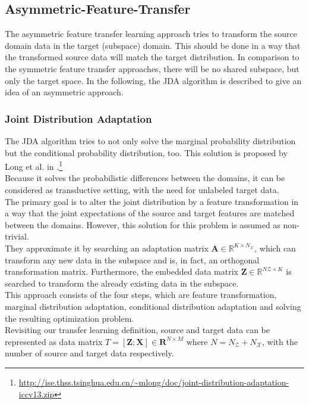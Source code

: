 \subsection{Asymmetric-Feature-Transfer}\label{TlSubSecHomoAsymFeature}
The asymmetric feature transfer learning approach tries to transform the source domain data in the target (subspace) domain.
This should be done in a way that the transformed source data will match the target distribution.
In comparison to the symmetric feature transfer approaches, there will be no shared subspace, but only the target space.
In the following, the \ac{JDA} algorithm is described to give an idea of an asymmetric approach.\cite[p. 6; 10]{Weiss.2016}
\subsubsection{Joint Distribution Adaptation}
The \acl{JDA} algorithm tries to not only solve the marginal probability distribution but the conditional probability distribution, too.
This solution is proposed by Long et al. in \cite{Long.}.\footnote{\url{http://ise.thss.tsinghua.edu.cn/~mlong/doc/joint-distribution-adaptation-iccv13.zip}}\\
Because it solves the probabilistic differences between the domains, it can be considered as transductive setting, with the need for unlabeled target data.\\
The primary goal is to alter the joint distribution by a feature transformation in a way that the joint expectations of the source and target features are matched between the domains.
However, this solution for this problem is assumed as non-trivial.\cite{Long.}\\
They approximate it by searching an adaptation matrix $\mathbf{A} \in \mathbb{R}^{K \times N_\mathcal{X} }$, which can transform any new data in the subspace and is, in fact, an orthogonal transformation matrix.
Furthermore, the embedded data matrix $\mathbf{Z} \in \mathbb{R}^{N\mathcal{Z}\times K}$ is searched to transform the already existing data in the subspace.\cite{Long.}\\
This approach consists of the four steps, which are feature transformation, marginal distribution adaptation, conditional distribution adaptation and solving the resulting optimization problem.\cite{Long.}\\
Revisiting our transfer learning definition, source and target data can be represented as data matrix $T = [\mathbf{Z};\mathbf{X}] \in \mathbf{R}^{N\times M}$ where $N = N_\mathcal{Z}+N_\mathcal{X}$, with the number of source and target data respectively.
